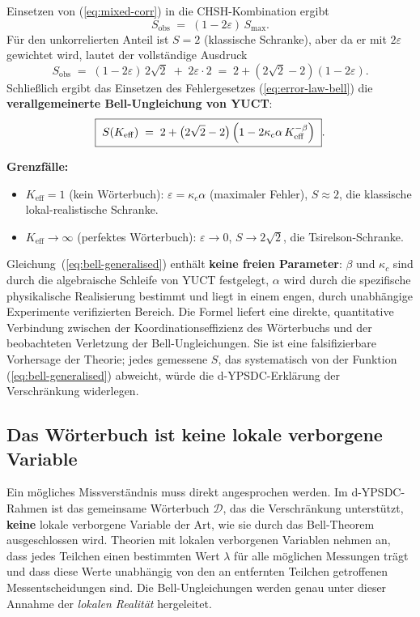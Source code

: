 \documentclass[12pt,a4paper]{article}
\theoremstyle{remark}
\begin{document}
	Einsetzen von (\ref{eq:mixed-corr}) in die CHSH-Kombination ergibt
	\[
	S_{\mathrm{obs}} \;=\; (1-2\varepsilon)\,S_{\max}.
	\]
	Für den unkorrelierten Anteil ist $S=2$ (klassische Schranke), aber da er mit $2\varepsilon$ gewichtet wird, lautet der vollständige Ausdruck
	\begin{equation}
		S_{\mathrm{obs}} \;=\; (1-2\varepsilon)\,2\sqrt{2} \;+\; 2\varepsilon\cdot 2
		\;=\; 2 + (2\sqrt{2}-2)(1-2\varepsilon).
		\label{eq:Sobs-intermediate}
	\end{equation}
	Schließlich ergibt das Einsetzen des Fehlergesetzes (\ref{eq:error-law-bell}) die
	\textbf{verallgemeinerte Bell-Ungleichung von YUCT}:
	\begin{equation}
		\boxed{\;
			S(K_{\mathrm{eff}}) \;=\; 2 + \bigl(2\sqrt{2}-2\bigr)\,
			\Bigl(1 - 2\kappa_c\alpha\,K_{\mathrm{eff}}^{-\beta}\Bigr)
			\;}.
		\label{eq:bell-generalised}
	\end{equation}
	
	\noindent
	\textbf{Grenzfälle:}
	\begin{itemize}
		\item $K_{\mathrm{eff}}=1$ (kein Wörterbuch): $\varepsilon = \kappa_c\alpha$ (maximaler Fehler), $S \approx 2$, die klassische lokal-realistische Schranke.
		\item $K_{\mathrm{eff}}\to\infty$ (perfektes Wörterbuch): $\varepsilon\to0$, $S\to 2\sqrt{2}$, die Tsirelson-Schranke.
	\end{itemize}
	
	Gleichung~(\ref{eq:bell-generalised}) enthält \textbf{keine freien Parameter}: $\beta$ und $\kappa_c$ sind durch die algebraische Schleife von YUCT festgelegt, $\alpha$ wird durch die spezifische physikalische Realisierung bestimmt und liegt in einem engen, durch unabhängige Experimente verifizierten Bereich. Die Formel liefert eine direkte, quantitative Verbindung zwischen der Koordinationseffizienz des Wörterbuchs und der beobachteten Verletzung der Bell-Ungleichungen. Sie ist eine falsifizierbare Vorhersage der Theorie; jedes gemessene $S$, das systematisch von der Funktion (\ref{eq:bell-generalised}) abweicht, würde die d-YPSDC-Erklärung der Verschränkung widerlegen.
	
	\subsection*{Das Wörterbuch ist keine lokale verborgene Variable}
	
	Ein mögliches Missverständnis muss direkt angesprochen werden. Im d-YPSDC-Rahmen ist das gemeinsame Wörterbuch $\mathcal{D}$, das die Verschränkung unterstützt, \textbf{keine} lokale verborgene Variable der Art, wie sie durch das Bell-Theorem ausgeschlossen wird. Theorien mit lokalen verborgenen Variablen nehmen an, dass jedes Teilchen einen bestimmten Wert $\lambda$ für alle möglichen Messungen trägt und dass diese Werte unabhängig von den an entfernten Teilchen getroffenen Messentscheidungen sind. Die Bell-Ungleichungen werden genau unter dieser Annahme der \emph{lokalen Realität} hergeleitet.
	
\end{document}

